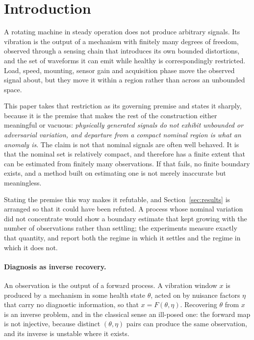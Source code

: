 \section{Introduction}
\label{sec:introduction}

A rotating machine in steady operation does not produce arbitrary signals. Its
vibration is the output of a mechanism with finitely many degrees of freedom,
observed through a sensing chain that introduces its own bounded distortions,
and the set of waveforms it can emit while healthy is correspondingly
restricted. Load, speed, mounting, sensor gain and acquisition phase move the
observed signal about, but they move it within a region rather than across an
unbounded space.

This paper takes that restriction as its governing premise and states it
sharply, because it is the premise that makes the rest of the construction
either meaningful or vacuous: \emph{physically generated signals do not
exhibit unbounded or adversarial variation, and departure from a compact
nominal region is what an anomaly is}. The claim is not that nominal signals
are often well behaved. It is that the nominal set is relatively compact, and
therefore has a finite extent that can be estimated from finitely many
observations. If that fails, no finite boundary exists, and a method built on
estimating one is not merely inaccurate but meaningless.

Stating the premise this way makes it refutable, and Section~\ref{sec:results}
is arranged so that it could have been refuted. A process whose nominal
variation did not concentrate would show a boundary estimate that kept growing
with the number of observations rather than settling; the experiments measure
exactly that quantity, and report both the regime in which it settles and the
regime in which it does not.

\paragraph{Diagnosis as inverse recovery.}
An observation is the output of a forward process. A vibration window \(x\) is
produced by a mechanism in some health state \(\theta\), acted on by nuisance
factors \(\eta\) that carry no diagnostic information, so that
\(x=F(\theta,\eta)\). Recovering \(\theta\) from \(x\) is an inverse problem,
and in the classical sense an ill-posed one: the forward map is not injective,
because distinct \((\theta,\eta)\) pairs can produce the same observation, and
its inverse is unstable where it exists.

